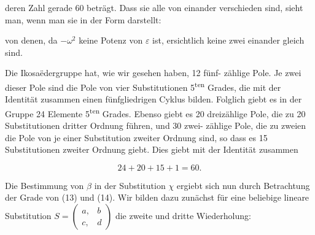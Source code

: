 deren Zahl gerade 60 betr\"agt. Dass sie alle von einander verschieden
 sind, sieht man, wenn man sie in der Form darstellt:





von denen, da $-\omega^2$ keine Potenz von $\varepsilon$ ist, ersichtlich keine
zwei einander gleich sind.

Die Ikosa\"edergruppe hat, wie wir gesehen haben, 12 f\"unf-
z\"ahlige Pole. Je zwei dieser Pole sind die Pole von vier Substitutionen
 5\textsuperscript{ten} Grades, die mit der Identit\"at zusammen einen
f\"unfgliedrigen Cyklus bilden. Folglich giebt es in der Gruppe
24 Elemente 5\textsuperscript{ten} Grades. Ebenso giebt es 20 dreiz\"ahlige Pole,
die zu 20 Substitutionen dritter Ordnung f\"uhren, und 30 zwei-
z\"ahlige Pole, die zu zweien die Pole von je einer Substitution
zweiter Ordnung sind, so dass es 15 Substitutionen zweiter Ordnung
 giebt. Dies giebt mit der Identit\"at zusammen

\[
24 + 20 + 15 + 1 = 60.
\]

Die Bestimmung von $\beta$ in der Substitution $\chi$ ergiebt sich
nun durch Betrachtung der Grade von (13) und (14). Wir bilden
dazu zun\"achst f\"ur eine beliebige lineare Substitution $S = \begin{pmatrix} a, & b \\ c, & d \end{pmatrix}$
die zweite und dritte Wiederholung:

